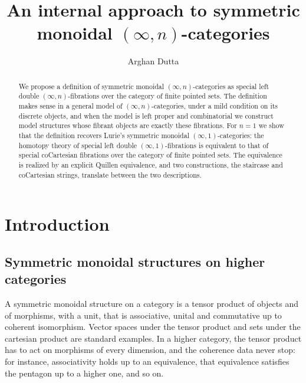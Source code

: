 \documentclass[10pt,reqno]{amsart}
\title{An internal approach to symmetric monoidal $(\infty,n)$-categories}
\author{Arghan Dutta}
\begin{document}
\flushbottom

\begin{abstract}
We propose a definition of symmetric monoidal $(\infty,n)$-categories
as special left double $(\infty,n)$-fibrations over the category of
finite pointed sets. The definition makes sense in a general model of
$(\infty,n)$-categories, under a mild condition on its discrete
objects, and when the model is left proper and combinatorial we
construct model structures whose fibrant objects are exactly these
fibrations. For $n=1$ we show that the definition recovers Lurie's
symmetric monoidal $(\infty,1)$-categories: the homotopy theory of
special left double $(\infty,1)$-fibrations is equivalent to that of
special coCartesian fibrations over the category of finite pointed
sets. The equivalence is realized by an explicit Quillen equivalence,
and two constructions, the staircase and coCartesian strings, translate
between the two descriptions.
\end{abstract}


\maketitle

\tableofcontents


\section*{Introduction}

\subsection*{Symmetric monoidal structures on higher categories}
A symmetric monoidal structure on a category is a tensor product of
objects and of morphisms, with a unit, that is associative, unital and
commutative up to coherent isomorphism. Vector spaces under the tensor
product and sets under the cartesian product are standard examples. In
a higher category, the tensor product has to act on morphisms of every
dimension, and the coherence data never stop: for instance,
associativity holds up to an equivalence, that equivalence satisfies
the pentagon up to a higher one, and so on.
\end{document}
